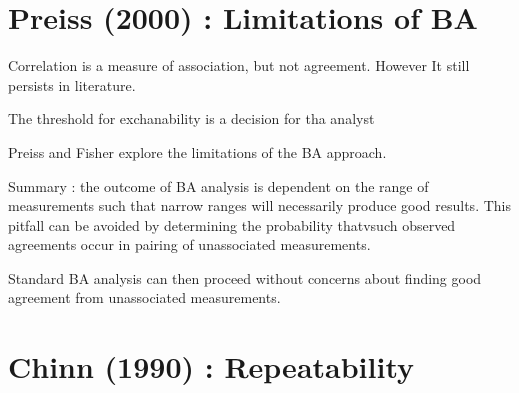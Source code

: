 %

\section*{Preiss (2000) : Limitations of BA }

Correlation is a measure of association, but not agreement. However It still persists in literature.

The threshold for exchanability is a decision for tha analyst

Preiss and Fisher explore the limitations of the BA approach.

Summary : the outcome of BA analysis is dependent on the range of measurements such that narrow ranges will necessarily produce good results.
This pitfall can be avoided by determining the probability thatvsuch observed agreements occur in pairing of unassociated measurements.

Standard BA analysis can then proceed without concerns about finding good agreement from unassociated measurements.



\section*{Chinn (1990) : Repeatability}
